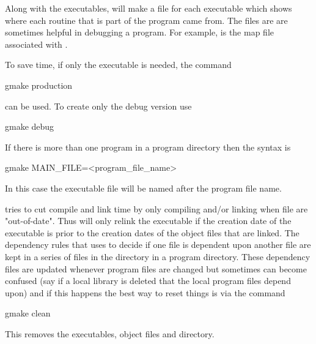 Along with the executables,  will make a  file for
each executable which shows where each routine that is part of the
program came from. The  files are are sometimes helpful in
debugging a program. For example,  is the
map file associated with .

To save time, if only the  executable is needed, the command
\begin{example}
  gmake production
\end{example}
can be used. To create only the debug version use
\begin{example}
  gmake debug
\end{example}
If there is more than one program in a program directory then the
 syntax is
\begin{example}
  gmake MAIN_FILE=<program_file_name>
\end{example}
In this case the executable file will be named after the program file
name.

 tries to cut compile and link time by only compiling and/or
linking when file are "out-of-date". Thus  will only relink
the executable if the creation date of the executable is prior to the
creation dates of the object files that are linked. The dependency
rules that  uses to decide if one file is dependent upon
another file are kept in a series of files in the 
directory in a program directory. These dependency files are updated
whenever program files are changed but sometimes  can become
confused (say if a local library is deleted that the local program
files depend upon) and if this happens the best way to reset things is
via the command
\begin{example}
  gmake clean
\end{example}
This removes the executables, object files and  directory.

